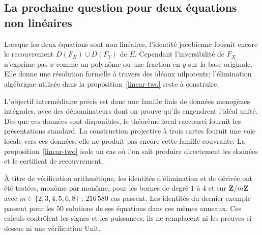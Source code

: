 \documentclass[11pt]{amsart}
\begin{document}
\subsection{La prochaine question pour deux équations non linéaires}

Lorsque les deux équations sont non linéaires, l'identité jacobienne
fournit encore le recouvrement $D(F_X)\cup D(F_Y)$ de $E$.
Cependant l'inversibilité de $F_X$ n'exprime pas $x$ comme un
polynôme ou une fraction en $y$ sur la base originale. Elle donne
une résolution formelle à travers des idéaux nilpotents; l'élimination
algébrique utilisée dans la proposition~\ref{linear-two} reste à
construire.

L'objectif intermédiaire précis est donc une famille finie de données
monogènes intégrales, avec des dénominateurs dont on prouve qu'ils
engendrent l'idéal unité. Dès que ces données sont disponibles, le
théorème local raccourci fournit les présentations standard.
La construction projective à trois cartes fournit une voie locale
vers ces données; elle ne produit pas encore cette famille couvrante.
La proposition~\ref{linear-two} isole un cas où l'on sait produire
directement les données et le certificat de recouvrement.

À titre de vérification arithmétique, les identités d'élimination et
de dérivée ont été testées, monôme par monôme, pour les bornes de
degré $1$ à $4$ et sur $\mathbf Z/m\mathbf Z$ avec
$m\in\{2,3,4,5,6,8\}$ : $216\,580$ cas passent. Les identités du
dernier exemple passent pour les $50$ solutions de ses équations dans
ces mêmes anneaux. Ces calculs contrôlent les signes et les puissances;
ils ne remplacent ni les preuves ci-dessus ni une vérification Unit.
\end{document}
